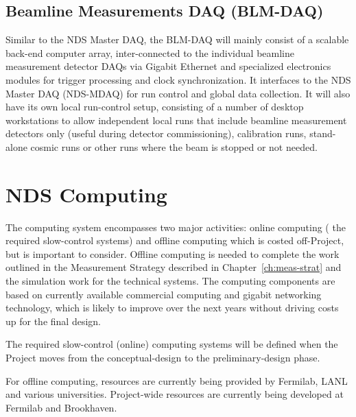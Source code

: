 \subsection{Beamline Measurements DAQ (BLM-DAQ)}

Similar to the NDS Master DAQ, the BLM-DAQ will mainly consist of a scalable back-end 
computer array, inter-connected to the individual beamline measurement detector DAQs via 
Gigabit Ethernet and specialized electronics modules for trigger processing and clock 
synchronization. 
It interfaces to the NDS Master DAQ (NDS-MDAQ) for run control and global 
data collection. It will also have its own local run-control setup, consisting of a number 
of desktop workstations to allow independent local runs that include beamline measurement 
detectors only (useful during detector commissioning), calibration runs, stand-alone cosmic 
runs or other runs where the beam is stopped or not needed.


\section{NDS Computing}
\label{sec:nd-gdaq-global-computing}

The computing system encompasses two major activities: %
online computing (%
the required slow-control systems) and %
offline 
computing which is costed off-Project, but is important to consider.
Offline computing is needed to complete 
the work outlined in the Measurement Strategy described in Chapter~\ref{ch:meas-strat} and the simulation work %
for the technical systems.
The computing components are based 
on currently available commercial computing and gigabit networking technology, which is 
likely to improve over the next years without driving costs up for the final design.  


The required slow-control (online) computing systems will be defined when the Project moves 
from the conceptual-design to the preliminary-design phase.

For offline computing, resources are currently being provided by Fermilab, 
LANL and various universities.  Project-wide resources are currently 
being developed at Fermilab and Brookhaven.
